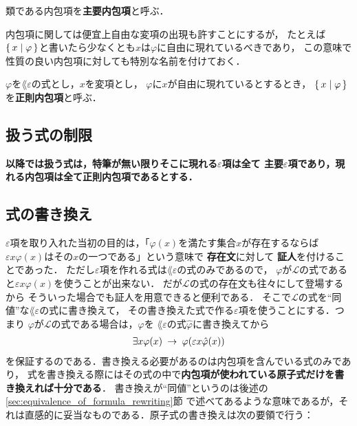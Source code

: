 	\begin{screen}
		\begin{dfn}[主要内包項]
			類である内包項を{\bf 主要内包項}と呼ぶ．
		\end{dfn}
	\end{screen}
	
	内包項に関しては便宜上自由な変項の出現も許すことにするが，
	たとえば$\{\, x \mid \varphi\, \}$と書いたら少なくとも$x$は$\varphi$に自由に現れているべきであり，
	この意味で性質の良い内包項に対しても特別な名前を付けておく．
	
	\begin{screen}
		\begin{dfn}[正則内包項]
			$\varphi$を$\lang{\varepsilon}$の式とし，$x$を変項とし，
			$\varphi$に$x$が自由に現れているとするとき，
			$\{\, x \mid \varphi\, \}$を{\bf 正則内包項}\index{せいそくないほうこう@正則内包項}と呼ぶ．
		\end{dfn}
	\end{screen}
	
\subsection{扱う式の制限}
\label{sec:restriction_of_formulas}
	{\bf 以降では扱う式は，特筆が無い限りそこに現れる$\varepsilon$項は全て
	主要$\varepsilon$項であり，現れる内包項は全て正則内包項であるとする．}

\subsection{式の書き換え}
	$\varepsilon$項を取り入れた当初の目的は，「$\varphi(x)$を満たす集合$x$が存在するならば
	$\varepsilon x \varphi(x)$はその$x$の一つである」という意味で
	{\bf 存在文}に対して
	{\bf 証人}を付けることであった．
	ただし$\varepsilon$項を作れる式は$\lang{\varepsilon}$の式のみであるので，
	$\varphi$が$\mathcal{L}$の式であると$\varepsilon x \varphi(x)$を使うことが出来ない．
	だが$\mathcal{L}$の式の存在文も往々にして登場するから
	そういった場合でも証人を用意できると便利である．
	そこで$\mathcal{L}$の式を``同値''な$\lang{\varepsilon}$の式に書き換えて，
	その書き換えた式で作る$\varepsilon$項を使うことにする．つまり
	$\varphi$が$\mathcal{L}$の式である場合は，$\varphi$を
	$\lang{\varepsilon}$の式$\hat{\varphi}$に書き換えてから
	\begin{align}
		\exists x \varphi(x) \hspace{0.25em}\rightarrow\hspace{0.25em} \varphi(\varepsilon x \hat{\varphi}(x))
	\end{align}
	を保証するのである．書き換える必要があるのは内包項を含んでいる式のみであり，
	式を書き換える際にはその式の中で{\bf 内包項が使われている原子式だけを書き換えれば十分である}．
	書き換えが``同値''というのは後述の\ref{sec:equivalence_of_formula_rewriting}節
	で述べてあるような意味であるが，それは直感的に妥当なものである．原子式の書き換えは次の要領で行う：
	
